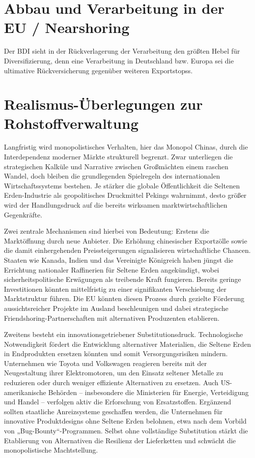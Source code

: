 \documentclass[12pt,a4paper,oneside]{book} %
\begin{document}
\section{Abbau und Verarbeitung in der EU / Nearshoring}

Der BDI sieht in der Rückverlagerung der Verarbeitung den \glqq größten Hebel für Diversifizierung\glqq, denn eine Verarbeitung in Deutschland bzw. Europa sei \glqq die ultimative Rückversicherung gegenüber weiteren Exportstopss\glqq.\autocite{Stefan Steinicke, BDI, 06.05.2025}

\section{Realismus-Überlegungen zur Rohstoffverwaltung}

Langfristig wird monopolistisches Verhalten, hier das Monopol Chinas, durch die Interdependenz moderner Märkte strukturell begrenzt. Zwar unterliegen die strategischen Kalküle und Narrative zwischen Großmächten einem raschen Wandel, doch bleiben die grundlegenden Spielregeln des internationalen Wirtschaftssystems bestehen. Je stärker die globale Öffentlichkeit die Seltenen Erden-Industrie als geopolitisches Druckmittel Pekings wahrnimmt, desto größer wird der Handlungsdruck auf die bereits wirksamen marktwirtschaftlichen Gegenkräfte.

Zwei zentrale Mechanismen sind hierbei von Bedeutung: Erstens die Marktöffnung durch neue Anbieter. Die Erhöhung chinesischer Exportzölle sowie die damit einhergehenden Preissteigerungen signalisieren wirtschaftliche Chancen. Staaten wie Kanada, Indien und das Vereinigte Königreich haben jüngst die Errichtung nationaler Raffinerien für Seltene Erden angekündigt, wobei sicherheitspolitische Erwägungen als treibende Kraft fungieren. Bereits geringe Investitionen könnten mittelfristig zu einer signifikanten Verschiebung der Marktstruktur führen. Die EU könnten diesen Prozess durch gezielte Förderung aussichtsreicher Projekte im Ausland beschleunigen und dabei strategische Friendshoring-Partnerschaften mit alternativen Produzenten etablieren.

Zweitens besteht ein innovationsgetriebener Substitutionsdruck. Technologische Notwendigkeit fördert die Entwicklung alternativer Materialien, die Seltene Erden in Endprodukten ersetzen könnten und somit Versorgungsrisiken mindern. Unternehmen wie Toyota und Volkswagen reagieren bereits mit der Neugestaltung ihrer Elektromotoren, um den Einsatz seltener Metalle zu reduzieren oder durch weniger effiziente Alternativen zu ersetzen. Auch US-amerikanische Behörden – insbesondere die Ministerien für Energie, Verteidigung und Handel – verfolgen aktiv die Erforschung von Ersatzstoffen. Ergänzend sollten staatliche Anreizsysteme geschaffen werden, die Unternehmen für innovative Produktdesigns ohne Seltene Erden belohnen, etwa nach dem Vorbild von „Bug-Bounty“-Programmen. Selbst ohne vollständige Substitution stärkt die Etablierung von Alternativen die Resilienz der Lieferketten und schwächt die monopolistische Machtstellung.
\end{document}
